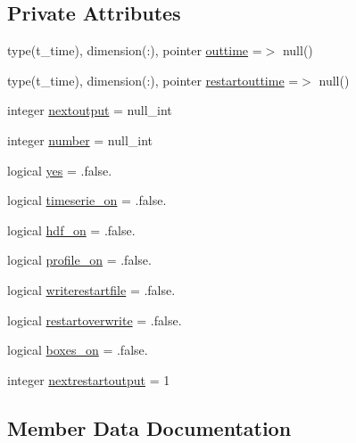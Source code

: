 \subsection*{Private Attributes}
\begin{DoxyCompactItemize}
\item 
type(t\+\_\+time), dimension(\+:), pointer \mbox{\hyperlink{structmodulerunoffproperties_1_1t__output_a5d37ca574887c130686071553ee04cf9}{outtime}} =$>$ null()
\item 
type(t\+\_\+time), dimension(\+:), pointer \mbox{\hyperlink{structmodulerunoffproperties_1_1t__output_a7370ef5f8eedf2761dc929ab5ab5db5a}{restartouttime}} =$>$ null()
\item 
integer \mbox{\hyperlink{structmodulerunoffproperties_1_1t__output_ace070b11c5054f631d742d413a669538}{nextoutput}} = null\+\_\+int
\item 
integer \mbox{\hyperlink{structmodulerunoffproperties_1_1t__output_a6fbbd194ee1fee15ffb2262c6958e488}{number}} = null\+\_\+int
\item 
logical \mbox{\hyperlink{structmodulerunoffproperties_1_1t__output_a286273cb5aba2d49d60eb3925a74f093}{yes}} = .false.
\item 
logical \mbox{\hyperlink{structmodulerunoffproperties_1_1t__output_ad141de6355570c2e309ff115967ca73b}{timeserie\+\_\+on}} = .false.
\item 
logical \mbox{\hyperlink{structmodulerunoffproperties_1_1t__output_a07cfebb2a3989b900df787a35ed1621d}{hdf\+\_\+on}} = .false.
\item 
logical \mbox{\hyperlink{structmodulerunoffproperties_1_1t__output_a87c9e083671db3b2f3bfc92bb95b258f}{profile\+\_\+on}} = .false.
\item 
logical \mbox{\hyperlink{structmodulerunoffproperties_1_1t__output_aaa9d74a891435f35dc9ef46f2ba503cb}{writerestartfile}} = .false.
\item 
logical \mbox{\hyperlink{structmodulerunoffproperties_1_1t__output_a19522ddd568f6ea1c2e0270cac993e60}{restartoverwrite}} = .false.
\item 
logical \mbox{\hyperlink{structmodulerunoffproperties_1_1t__output_a892da6a4ae7d8930e8410e7d250d8971}{boxes\+\_\+on}} = .false.
\item 
integer \mbox{\hyperlink{structmodulerunoffproperties_1_1t__output_a1fc0443b81033eee772f7cdeef4a088e}{nextrestartoutput}} = 1
\end{DoxyCompactItemize}


\subsection{Member Data Documentation}
\mbox{\label{structmodulerunoffproperties_1_1t__output_a892da6a4ae7d8930e8410e7d250d8971}} 
